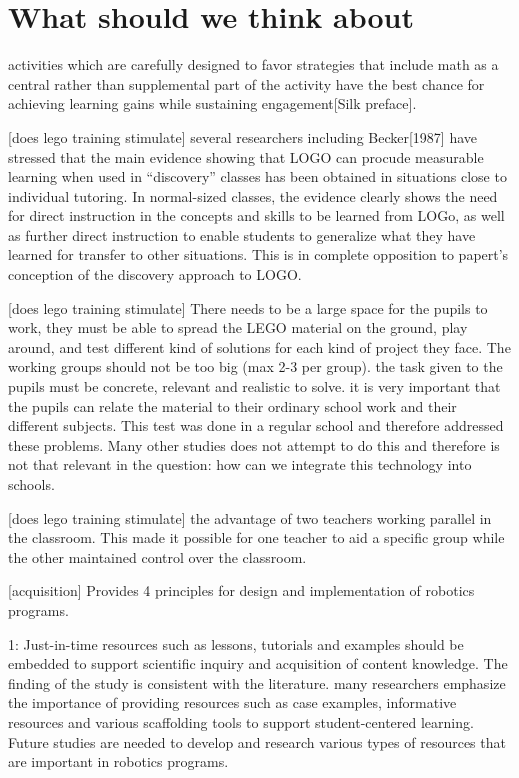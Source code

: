 \section{What should we think about}

activities which are carefully designed to favor strategies that include math as a central rather than supplemental part of the activity have the best chance for achieving learning gains while sustaining engagement[Silk preface]. 

[does lego training stimulate] several researchers including Becker[1987] have stressed that the main evidence showing that LOGO can procude measurable learning when used in "`discovery"' classes has been obtained in situations close to individual tutoring. In normal-sized classes, the evidence clearly shows the need for direct instruction in the concepts and skills to be learned from LOGo, as well as further direct instruction to enable students to generalize what they have learned for transfer to other situations. This is in complete opposition to papert's conception of the discovery approach to LOGO.

[does lego training stimulate] There needs to be a large space for the pupils to work, they must be able to spread the LEGO material on the ground, play around, and test different kind of solutions for each kind of project they face. The working groups should not be too big (max 2-3 per group). the task given to the pupils must be concrete, relevant and realistic to solve. it is very important that the pupils can relate the material to their ordinary school work and their different subjects. This test was done in a regular school and therefore addressed these problems. Many other studies does not attempt to do this and therefore is not that relevant in the question: how can we integrate this technology into schools. 

[does lego training stimulate] the advantage of two teachers working parallel in the classroom. This made it possible for one teacher to aid a specific group while the other maintained control over the classroom. 

[acquisition] Provides 4 principles for design and implementation of robotics programs. 

1: Just-in-time resources such as lessons, tutorials and examples should be embedded to support scientific inquiry and acquisition of content knowledge. The finding of the study is consistent with the literature. many researchers emphasize the importance of providing resources such as case examples, informative resources and various scaffolding tools to support student-centered learning. Future studies are needed to develop and research various types of resources that are important in robotics programs. 

